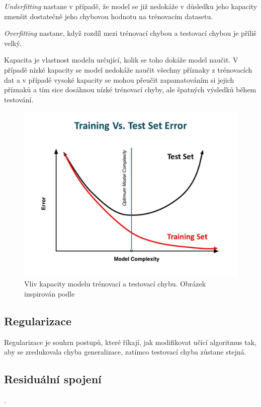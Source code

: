 \textit{Underfitting} nastane v případě, že model se již nedokáže v důsledku jeho kapacity zmenšit dostatečně jeho chybovou hodnotu na trénovacím datasetu.

\textit{Overfitting} nastane, když rozdíl mezi trénovací chybou a testovací chybou je příliš velký.

Kapacita je vlastnost modelu určující, kolik se toho dokáže model naučit. V případě nízké kapacity se model nedokáže naučit všechny příznaky z trénovacích dat a v případě vysoké kapacity se mohou přeučit zapamatováním si jejich příznaků a tím sice dosáhnou nízké trénovací chyby, ale špatných výsledků během testování\cite[p107]{mitdeeplearning}.
\begin{figure}[H]
    \centering
    \includegraphics[scale=0.3]{obrazky-figures/capacity_vs_error.jpg}
    \caption{\label{fig:gradientdescent}Vliv kapacity modelu trénovací a testovací chybu. Obrázek inspirován podle \cite{trainingvstesterror}}
\end{figure}


\subsection{Regularizace}
Regularizace je souhrn postupů, které říkají, jak modifikovat učící algoritmus tak, aby se zredukovala chyba generalizace, zatímco testovací chyba zůstane stejná\cite[p117]{mitdeeplearning}.


\subsection{Residuální spojení}
.


